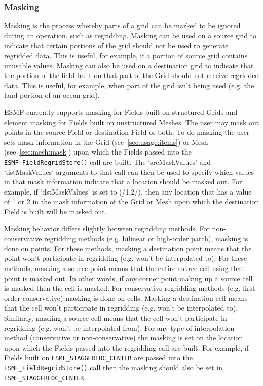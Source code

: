 \subsubsection{Masking}
 Masking is the process whereby parts of a grid can be marked to be ignored during an operation, such as regridding. Masking can be used on a source grid to 
 indicate that certain portions of the grid should not be used to generate regridded data. This is useful, for example, if a portion of source grid contains 
 unusable values. Masking can also be used on a destination grid to indicate that the portion of the field built on that part of the Grid should not receive 
 regridded data. This is useful, for example, when part of the grid isn't being used (e.g. the land portion of an ocean grid).

 ESMF currently supports masking for Fields built on structured Grids and element masking for Fields built on unstructured Meshes. The user may mask out points 
 in the source Field or destination Field or both. To do masking the user sets mask information in the Grid (see~\ref{sec:usage:items}) or 
 Mesh (see~\ref{sec:mesh:mask}) upon which the Fields passed into the 
 {\tt ESMF\_FieldRegridStore()} call are built. The `srcMaskValues' and `dstMaskValues' arguments to that call can then be used to specify which values in that mask 
 information indicate that a location should be masked out. For example, if `dstMaskValues' is set to (/1,2/), then any location that has a value of 1 or 2 in 
 the mask information of the Grid or Mesh upon which the destination Field is built will be masked out.

 Masking behavior differs slightly between regridding methods. For non-conservative regridding methods (e.g. bilinear or high-order patch), masking is done on
 points. For these methods, masking a destination point means that the point won't participate in regridding (e.g. won't be interpolated to). For these methods, 
 masking a source point means that the entire source cell using that point is masked out. In other words, if any corner point making up a source cell is masked 
 then the cell is masked. For conservative regridding methods (e.g. first-order conservative) masking is done on cells. Masking a destination cell means that the 
 cell won't participate in regridding (e.g. won't be interpolated to). Similarly, masking a source cell means that the cell won't participate in regridding 
 (e.g. won't be interpolated from). For any type of interpolation method (conservative or non-conservative) the masking is set on the location upon which the 
 Fields passed into the regridding call are built. For example, if Fields built on {\tt ESMF\_STAGGERLOC\_CENTER} are passed into the {\tt ESMF\_FieldRegridStore()} 
 call then the masking should also be set in {\tt ESMF\_STAGGERLOC\_CENTER}.


